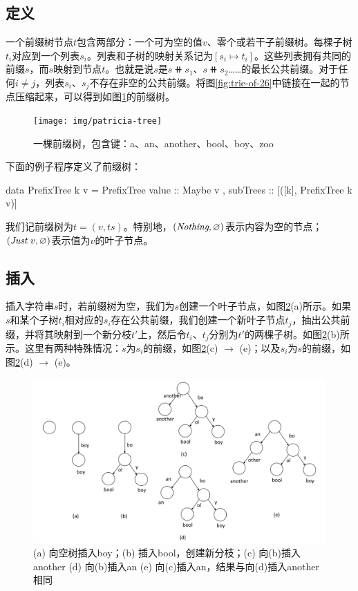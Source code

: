\documentclass[b5paper]{ctexart}
\begin{document}
\subsection{定义}
一个前缀树节点$t$包含两部分：一个可为空的值$v$、零个或若干子前缀树。每棵子树$t_i$对应到一个列表$s_i$。列表和子树的映射关系记为$[s_i \mapsto t_i]$。这些列表拥有共同的前缀$s$，而$s$映射到节点$t$。也就是说$s$是$s \doubleplus s_1$、$s \doubleplus s_2$……的最长公共前缀。对于任何$i \neq j$，列表$s_i$、$s_j$不存在非空的公共前缀。将图\ref{fig:trie-of-26}中链接在一起的节点压缩起来，可以得到如图\ref{fig:patricia-tree}的前缀树。

\begin{figure}[htbp]
  \centering
  \texttt{[image: img/patricia-tree]}
  \caption{一棵前缀树，包含键：a、an、another、bool、boy、zoo}
  \label{fig:patricia-tree}
\end{figure}

下面的例子程序定义了前缀树：

\begin{Haskell}
data PrefixTree k v = PrefixTree { value :: Maybe v
                                 , subTrees :: [([k], PrefixTree k v)]}
\end{Haskell}

我们记前缀树为$t = (v, ts)$。特别地，$(\textit{Nothing}, \varnothing)$表示内容为空的节点；$(\textit{Just}\ v, \varnothing)$表示值为$v$的叶子节点。

\subsection{插入}

插入字符串$s$时，若前缀树为空，我们为$s$创建一个叶子节点，如图\ref{fig:patricia-insert}(a)所示。如果$s$和某个子树$t_i$相对应的$s_i$存在公共前缀，我们创建一个新叶子节点$t_j$，抽出公共前缀，并将其映射到一个新分枝$t'$上，然后令$t_i$、$t_j$分别为$t'$的两棵子树。如图\ref{fig:patricia-insert}(b)所示。这里有两种特殊情况：$s$为$s_i$的前缀，如图\ref{fig:patricia-insert}(c) $\to$ (e)；以及$s_i$为$s$的前缀，如图\ref{fig:patricia-insert}(d) $\to$ (e)。

\begin{figure}[htbp]
  \centering
  \includegraphics[scale=0.4]{img/prefix-tree-insert}
  \caption{(a) 向空树插入boy；(b) 插入bool，创建新分枝；(c) 向(b)插入another (d) 向(b)插入an (e) 向(c)插入an，结果与向(d)插入another相同}
  \label{fig:patricia-insert}
\end{figure}
\end{document}
